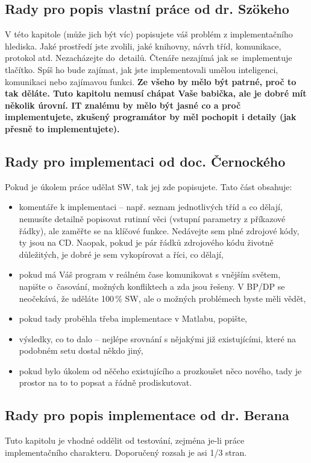 \subsection*{Rady pro popis vlastní práce od dr. Szökeho}
V této kapitole (může jich být víc) popisujete váš problém z implementačního hlediska. Jaké prostředí jste zvolili, jaké knihovny, návrh tříd, komunikace, protokol atd. Nezacházejte do~detailů. Čtenáře nezajímá jak se~implementuje tlačítko. Spíš ho bude zajímat, jak jste implementovali umělou inteligenci, komunikaci nebo zajímavou funkci. \bf Ze všeho by mělo být patrné, proč to tak děláte. \rm  Tuto kapitolu nemusí chápat Vaše babička, ale je dobré mít několik úrovní. IT znalému by mělo být jasné co a proč implementujete, zkušený programátor by měl pochopit i detaily (jak přesně to implementujete).

\subsection*{Rady pro implementaci od doc. Černockého}

Pokud je úkolem práce udělat  SW, tak jej zde popisujete. Tato část obsahuje:
\begin{itemize}
  \item{komentáře k implementaci -- např. seznam jednotlivých tříd a co dělají, nemusíte detailně popisovat rutinní věci (vstupní parametry z příkazové řádky), ale zaměřte se na klíčové funkce. Nedávejte sem plné zdrojové kódy, ty jsou na CD. Naopak, pokud je pár řádků zdrojového kódu životně důležitých, je dobré je sem vykopírovat a říci, co dělají,}
  \item{pokud má Váš program v reálném čase komunikovat s vnějším světem, napište o~časování, možných konfliktech a zda jsou řešeny. V BP/DP se neočekává, že uděláte 100\,\%  SW, ale o možných problémech byste měli vědět,}
  \item{pokud tady proběhla třeba implementace v Matlabu, popište,}
  \item{výsledky, co to dalo -- nejlépe srovnání s nějakými již existujícími, které na podobném setu dostal někdo jiný,}
  \item{pokud bylo úkolem  od něčeho existujícího a prozkoušet něco nového, tady je prostor na to to popsat a řádně prodiskutovat.}
\end{itemize}

\subsection*{Rady pro popis implementace od dr. Berana}
Tuto kapitolu je vhodné oddělit od testování, zejména je-li práce implementačního charakteru. Doporučený rozsah je asi 1/3 stran.

